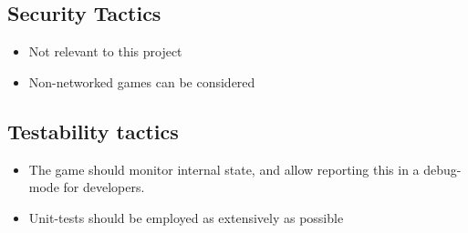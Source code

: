 \subsection{Security Tactics}
\begin{itemize}
	\item Not relevant to this project
	\item Non-networked games can be considered 
\end{itemize}

\subsection{Testability tactics}
\begin{itemize}
	\item The game should monitor internal state, and allow reporting this
	in a debug-mode for developers.
	\item Unit-tests should be employed as extensively as possible
\end{itemize}